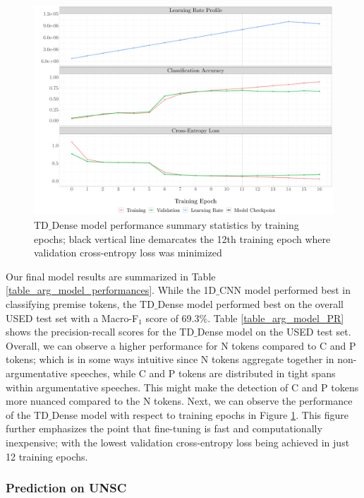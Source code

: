 \begin{figure}[t!]
    \centering
    \includegraphics[trim={1.0cm 0cm 0cm 0cm},clip,width=\textwidth]{img/model_training_evolution.pdf}
    \caption{TD$\_$Dense model performance summary statistics by training epochs; black vertical line demarcates the 12th training epoch where validation cross-entropy loss was minimized}
    \label{model_performance}
\end{figure}

Our final model results are summarized in Table \ref{table_arg_model_performances}. While the 1D$\_$CNN model performed best in classifying premise tokens, the TD$\_$Dense model performed best on the overall USED test set with a Macro-F$_1$ score of 69.3$\%$. Table \ref{table_arg_model_PR} shows the precision-recall scores for the TD$\_$Dense model on the USED test set. Overall, we can observe a higher performance for N tokens compared to C and P tokens; which is in some ways intuitive since N tokens aggregate together in non-argumentative speeches, while C and P tokens are distributed in tight spans within argumentative speeches. This might make the detection of C and P tokens more nuanced compared to the N tokens. Next, we can observe the performance of the TD$\_$Dense model with respect to training epochs in Figure \ref{model_performance}. This figure further emphasizes the point that fine-tuning is fast and computationally inexpensive; with the lowest validation cross-entropy loss being achieved in just 12 training epochs.

\subsubsection{Prediction on UNSC}

